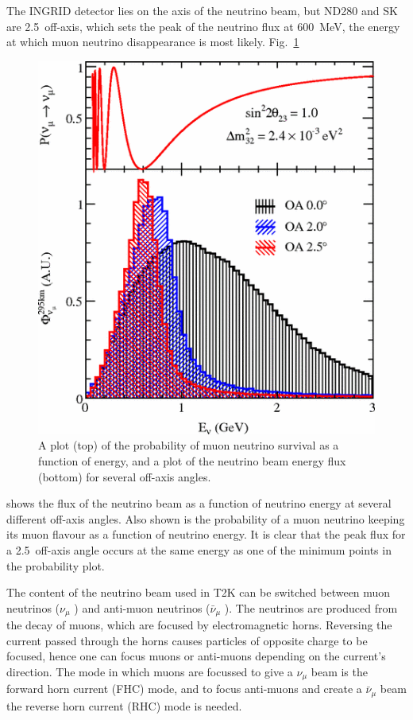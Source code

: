 \documentclass[aps,pra,12pt,notitlepage,tightenlines]{revtex4-1}
\newcommand{\numu}{$\nu_\mu$ }
\newcommand{\anumu}{$\bar\nu_\mu$ }
\begin{document}
The INGRID detector lies on the axis of the neutrino beam, but ND280 and SK are 2.5\degree\ off-axis, which sets the peak of the neutrino flux at 600~MeV, the energy at which muon neutrino disappearance is most likely. Fig.\ \ref{fig:axis} 
\begin{figure}
 \includegraphics[scale=0.5]{axis.png}
 \caption{A plot (top) of the probability of muon neutrino survival as a function of energy, and a plot of the neutrino beam energy flux (bottom) for several off-axis angles.}
 \label{fig:axis}
\end{figure}
shows the flux of the neutrino beam as a function of neutrino energy at several different off-axis angles. Also shown is the probability of a muon neutrino keeping its muon flavour as a function of neutrino energy. It is clear that the peak flux for a 2.5\degree\ off-axis angle occurs at the same energy as one of the minimum points in the probability plot.

The content of the neutrino beam used in T2K can be switched between muon neutrinos (\numu) and anti-muon neutrinos (\anumu). The neutrinos are produced from the decay of muons, which are focused by electromagnetic horns. Reversing the current passed through the horns causes particles of opposite charge to be focused, hence one can focus muons or anti-muons depending on the current's direction. The mode in which muons are focussed to give a \numu beam is the forward horn current (FHC) mode, and to focus anti-muons and create a \anumu beam the reverse horn current (RHC) mode is needed.
\end{document}
